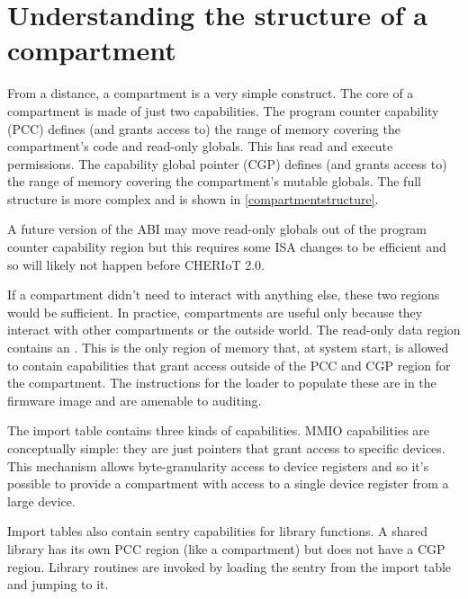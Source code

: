 \section{Understanding the structure of a compartment}

From a distance, a compartment is a very simple construct.
The core of a compartment is made of just two capabilities.
The program counter capability (PCC) defines (and grants access to) the range of memory covering the compartment's code and read-only globals.
This has read and execute permissions.
The capability global pointer (CGP) defines (and grants access to) the range of memory covering the compartment's mutable globals.
The full structure is more complex and is shown in \ref{compartmentstructure}.


\begin{note}
A future version of the ABI may move read-only globals out of the program counter capability region but this requires some ISA changes to be efficient and so will likely not happen before CHERIoT 2.0.
\end{note}

If a compartment didn't need to interact with anything else, these two regions would be sufficient.
In practice, compartments are useful only because they interact with other compartments or the outside world.
The read-only data region contains an .
This is the only region of memory that, at system start, is allowed to contain capabilities that grant access outside of the PCC and CGP region for the compartment.
The instructions for the loader to populate these are in the firmware image and are amenable to auditing.

The import table contains three kinds of capabilities.
MMIO capabilities are conceptually simple: they are just pointers that grant access to specific devices.
This mechanism allows byte-granularity access to device registers and so it's possible to provide a compartment with access to a single device register from a large device.

Import tables also contain sentry capabilities for library functions.
A shared library has its own PCC region (like a compartment) but does not have a CGP region.
Library routines are invoked by loading the sentry from the import table and jumping to it.


